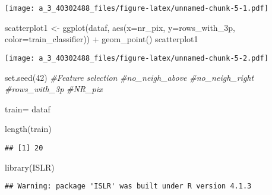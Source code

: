 \documentclass[
]{article}
\newenvironment{Shaded}{\begin{snugshade}}{\end{snugshade}}
\newcommand{\AttributeTok}[1]{\textcolor[rgb]{0.77,0.63,0.00}{#1}}
\newcommand{\CommentTok}[1]{\textcolor[rgb]{0.56,0.35,0.01}{\textit{#1}}}
\newcommand{\DecValTok}[1]{\textcolor[rgb]{0.00,0.00,0.81}{#1}}
\newcommand{\FunctionTok}[1]{\textcolor[rgb]{0.00,0.00,0.00}{#1}}
\newcommand{\NormalTok}[1]{#1}
\newcommand{\OtherTok}[1]{\textcolor[rgb]{0.56,0.35,0.01}{#1}}
\newcommand{\SpecialCharTok}[1]{\textcolor[rgb]{0.00,0.00,0.00}{#1}}
\begin{document}
\texttt{[image: a\_3\_40302488\_files/figure-latex/unnamed-chunk-5-1.pdf]}

\begin{Shaded}
\begin{Highlighting}[]
\NormalTok{scatterplot1 }\OtherTok{\textless{}{-}} \FunctionTok{ggplot}\NormalTok{(dataf, }\FunctionTok{aes}\NormalTok{(}\AttributeTok{x=}\NormalTok{nr\_pix, }\AttributeTok{y=}\NormalTok{rows\_with\_3p, }\AttributeTok{color=}\NormalTok{train\_classifier)) }\SpecialCharTok{+}
  \FunctionTok{geom\_point}\NormalTok{()}
\NormalTok{scatterplot1}
\end{Highlighting}
\end{Shaded}

\texttt{[image: a\_3\_40302488\_files/figure-latex/unnamed-chunk-5-2.pdf]}

\begin{Shaded}
\begin{Highlighting}[]
\FunctionTok{set.seed}\NormalTok{(}\DecValTok{42}\NormalTok{)}
\CommentTok{\#Feature selection}
\CommentTok{\#no\_neigh\_above}
\CommentTok{\#no\_neigh\_right}
\CommentTok{\#rows\_with\_3p}
\CommentTok{\#NR\_pix }


\NormalTok{train}\OtherTok{=}\NormalTok{ dataf}

\FunctionTok{length}\NormalTok{(train)}
\end{Highlighting}
\end{Shaded}

\begin{verbatim}
## [1] 20
\end{verbatim}

\begin{Shaded}
\begin{Highlighting}[]
\FunctionTok{library}\NormalTok{(ISLR)}
\end{Highlighting}
\end{Shaded}

\begin{verbatim}
## Warning: package 'ISLR' was built under R version 4.1.3
\end{verbatim}

\begin{Shaded}
\end{Shaded}
\end{document}
